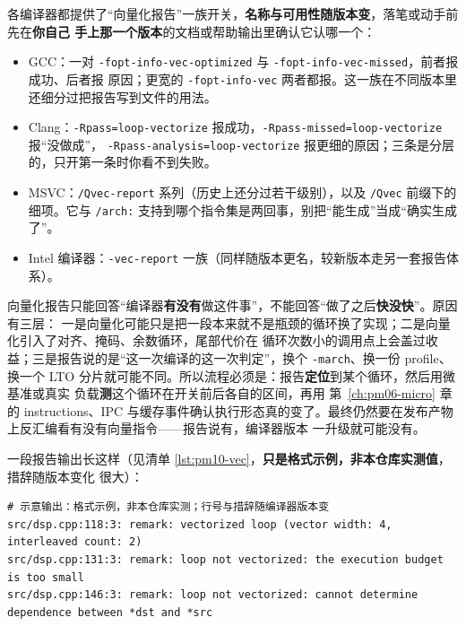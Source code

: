 \documentclass[12pt,a4paper,fontset=fandol]{ctexbook}
\newcommand{\Tp}[1]{\texttt{#1}}
\newcommand{\Mx}[1]{\textsf{#1}}
\begin{document}
各编译器都提供了``向量化报告''一族开关，\textbf{名称与可用性随版本变}，落笔或动手前先在\textbf{你自己
手上那一个版本}的文档或帮助输出里确认它认哪一个：

\begin{itemize}
  \item GCC：一对 \Tp{-fopt-info-vec-optimized} 与 \Tp{-fopt-info-vec-missed}，前者报成功、后者报
        原因；更宽的 \Tp{-fopt-info-vec} 两者都报。这一族在不同版本里还细分过把报告写到文件的用法。
  \item Clang：\Tp{-Rpass=loop-vectorize} 报成功，\Tp{-Rpass-missed=loop-vectorize} 报``没做成''，
        \Tp{-Rpass-analysis=loop-vectorize} 报更细的原因；三条是分层的，只开第一条时你看不到失败。
  \item MSVC：\Tp{/Qvec-report} 系列（历史上还分过若干级别），以及 \Tp{/Qvec} 前缀下的细项。它与
        \Tp{/arch:} 支持到哪个指令集是两回事，别把``能生成''当成``确实生成了''。
  \item Intel 编译器：\Tp{-vec-report} 一族（同样随版本更名，较新版本走另一套报告体系）。
\end{itemize}

\begin{warning}[title={把向量化报告当性能结论}]
向量化报告只能回答``编译器\textbf{有没有}做这件事''，不能回答``做了之后\textbf{快没快}''。原因有三层：
一是向量化可能只是把一段本来就不是瓶颈的循环换了实现；二是向量化引入了对齐、掩码、余数循环，尾部代价在
循环次数小的调用点上会盖过收益；三是报告说的是``这一次编译的这一次判定''，换个 \Tp{-march}、换一份
profile、换一个 LTO 分片就可能不同。所以流程必须是：报告\textbf{定位}到某个循环，然后用微基准或真实
负载\textbf{测}这个循环在开关前后各自的区间，再用 第~\ref{ch:pm06-micro} 章 的 \Mx{instructions}、\Mx{IPC}
与缓存事件确认执行形态真的变了。最终仍然要在发布产物上反汇编看有没有向量指令——报告说有，编译器版本
一升级就可能没有。
\end{warning}

一段报告输出长这样（见清单 \ref{lst:pm10-vec}，\textbf{只是格式示例，非本仓库实测值}，措辞随版本变化
很大）：

\begin{lstlisting}[style=outstyle,title={向量化报告形态示意（分层三行，格式示例非实测）},label={lst:pm10-vec}]
# 示意输出：格式示例，非本仓库实测；行号与措辞随编译器版本变
src/dsp.cpp:118:3: remark: vectorized loop (vector width: 4, interleaved count: 2)
src/dsp.cpp:131:3: remark: loop not vectorized: the execution budget is too small
src/dsp.cpp:146:3: remark: loop not vectorized: cannot determine dependence between *dst and *src
\end{lstlisting}
\end{document}
